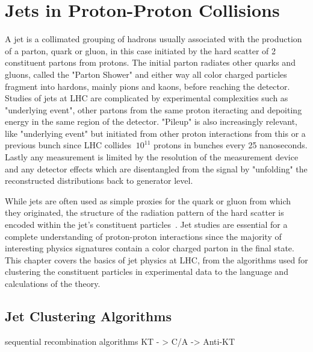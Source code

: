 \chapter{Jets in Proton-Proton Collisions}%

A jet is a collimated grouping of hadrons usually associated with the production of a parton, quark or gluon, in this case initiated by the hard scatter of 2 constituent partons from protons. The initial parton radiates other quarks and gluons, called the "Parton Shower" and either way all color charged particles fragment into hardons, mainly pions and kaons,  before reaching the detector. Studies of jets at LHC are complicated by experimental complexities such as "underlying event", other partons from the same proton iteracting and depoiting energy in the same region of the detector. "Pileup" is also increasingly relevant, like "underlying event" but initiated from other proton interactions from this or a previous bunch since LHC collides $~10^{11}$ protons in bunches every 25 nanoseconds. Lastly any measurement is limited by the resolution of the measurement device and any detector effects which are disentangled from the signal by "unfolding" the reconstructed distributions back to generator level.

While jets are often used as simple proxies for the quark or gluon from which they originated, the structure of the radiation pattern of the hard scatter is encoded within the jet's constituent particles~\cite{Asquith:2018igt}. Jet studies are essential for a complete understanding of proton-proton interactions since the majority of interesting physics signatures contain a color charged parton in the final state. This chapter covers the basics of jet physics at LHC, from the algorithms used for clustering the constituent particles in experimental data to the language and calculations of the theory.




\section{Jet Clustering Algorithms}\label{secSM:ch1}





sequential recombination algorithms
KT - > C/A -> Anti-KT
\cite{Tseng:2013dva}



